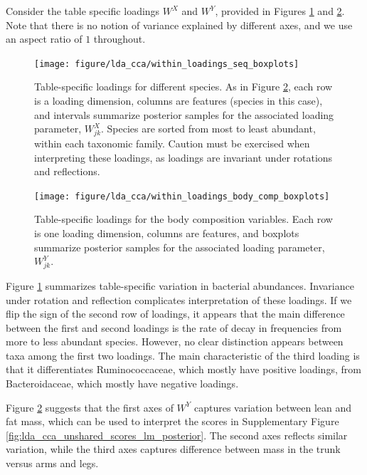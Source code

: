 \documentclass[14pt]{extarticle}
\begin{document}
Consider the table specific loadings $W^{X}$ and $W^{Y}$, provided in Figures
\ref{fig:lda_cca_within_loadings_seq_boxplots} and
\ref{fig:lda_cca_within_loadings_body_comp_boxplots}. Note that there is no
notion of variance explained by different axes, and we use an aspect ratio of
$1$ throughout.

\begin{figure}
  \centering
  \texttt{[image: figure/lda\_cca/within\_loadings\_seq\_boxplots]}
  \caption{Table-specific loadings for different species. As in Figure
    \ref{fig:lda_cca_within_loadings_body_comp_boxplots}, each row is a loading
    dimension, columns are features (species in this case), and intervals
    summarize posterior samples for the associated loading parameter,
    $W^{X}_{jk}$. Species are sorted from most to least abundant, within each
    taxonomic family. Caution must be exercised when interpreting these
    loadings, as loadings are invariant under rotations and
    reflections. \label{fig:lda_cca_within_loadings_seq_boxplots}}
\end{figure}

\begin{figure}
  \centering
  \texttt{[image: figure/lda\_cca/within\_loadings\_body\_comp\_boxplots]}
  \caption{Table-specific loadings for the body composition variables. Each row
    is one loading dimension, columns are features, and boxplots summarize
    posterior samples for the associated loading parameter, $W_{jk}^{Y}$.
  \label{fig:lda_cca_within_loadings_body_comp_boxplots}}
\end{figure}

Figure \ref{fig:lda_cca_within_loadings_seq_boxplots} summarizes table-specific variation in
bacterial abundances. Invariance under rotation and reflection complicates
interpretation of these loadings. If we flip the sign of the second row of
loadings, it appears that the main difference between the first and second
loadings is the rate of decay in frequencies from more to less abundant species.
However, no clear distinction appears between taxa among the first two loadings.
The main characteristic of the third loading is that it differentiates
Ruminococcaceae, which mostly have positive loadings, from Bacteroidaceae, which
mostly have negative loadings.

Figure \ref{fig:lda_cca_within_loadings_body_comp_boxplots} suggests that the
first axes of $W^{Y}$ captures variation between lean and fat mass, which can be
used to interpret the scores in Supplementary Figure
\ref{fig:lda_cca_unshared_scores_lm_posterior}. The second axes reflects similar
variation, while the third axes captures difference between mass in the trunk
versus arms and legs.
\end{document}

